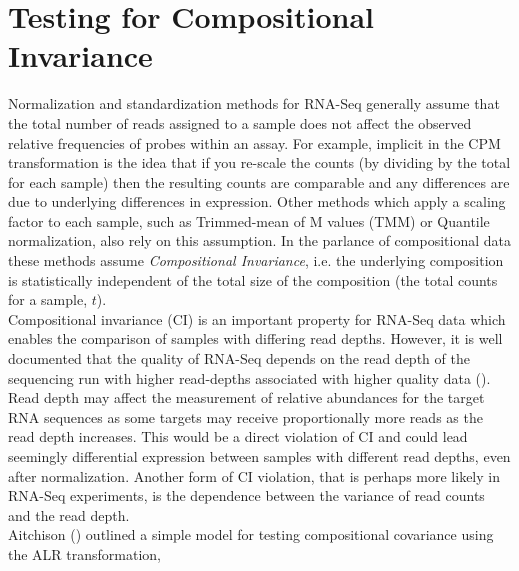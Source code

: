 \documentclass [10pt]{article}
\theoremstyle{definition}
\begin{document}
\FloatBarrier
\section{Testing for Compositional Invariance}




Normalization and standardization methods for RNA-Seq generally assume that the total number of reads assigned to a sample does not affect the observed relative frequencies of probes within an assay.  For example, implicit in the CPM transformation is the idea that if you re-scale the counts (by dividing by the total for each sample) then the resulting counts are comparable and any differences are due to underlying differences in expression.  Other methods which apply a scaling factor to each sample, such as Trimmed-mean of M values (TMM) or Quantile normalization, also rely on this assumption.  In the parlance of compositional data these methods assume \emph{Compositional Invariance}, i.e. the underlying composition is statistically independent of the total size of the composition (the total counts for a sample, $t$).\\

Compositional invariance (CI) is an important property for RNA-Seq data which enables the comparison of samples with differing read depths.  However, it is well documented that the quality of RNA-Seq depends on the read depth of the sequencing run with higher read-depths associated with higher quality data (\cite{Tarazona2011,Sims2014}). Read depth may affect the measurement of relative abundances for the target RNA sequences as some targets may receive proportionally more reads as the read depth increases.  This would be a direct violation of CI and could lead seemingly differential expression between samples with different read depths, even after normalization.  Another form of CI violation, that is perhaps more likely in RNA-Seq experiments, is the dependence between the variance of read counts and the read depth.\\


Aitchison (\citeyear{Aitchison1986}) outlined a simple model for testing compositional covariance using the ALR transformation,  \\
\end{document}
